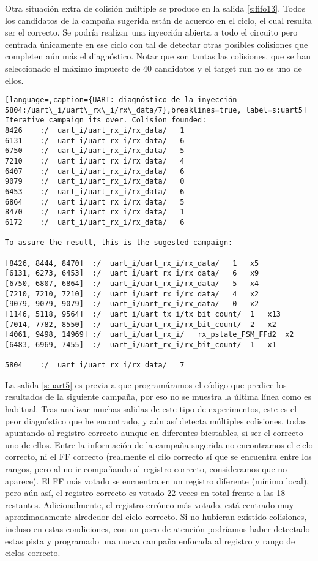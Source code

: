 Otra situación extra de colisión múltiple se produce en la salida \ref{s:fifo13}.
Todos los candidatos de la campaña sugerida están de acuerdo en el ciclo, el cual
resulta ser el correcto. Se podría realizar una inyección abierta a todo el 
circuito pero centrada únicamente en ese ciclo con tal de detectar otras posibles
colisiones que completen aún más el diagnóstico. Notar que son tantas las
colisiones, que se han seleccionado el máximo impuesto de 40 candidatos y el
target run no es uno de ellos.

\begin{lstlisting}[language=,caption={UART: diagnóstico de la inyección
5804:/uart\_i/uart\_rx\_i/rx\_data/7},breaklines=true, label=s:uart5]
Iterative campaign its over. Colision founded:
8426	:/	uart_i/uart_rx_i/rx_data/	1
6131	:/	uart_i/uart_rx_i/rx_data/	6
6750	:/	uart_i/uart_rx_i/rx_data/	5
7210	:/	uart_i/uart_rx_i/rx_data/	4
6407	:/	uart_i/uart_rx_i/rx_data/	6
9079	:/	uart_i/uart_rx_i/rx_data/	0
6453	:/	uart_i/uart_rx_i/rx_data/	6
6864	:/	uart_i/uart_rx_i/rx_data/	5
8470	:/	uart_i/uart_rx_i/rx_data/	1
6172	:/	uart_i/uart_rx_i/rx_data/	6

To assure the result, this is the sugested campaign:

[8426, 8444, 8470]	:/	uart_i/uart_rx_i/rx_data/	1	x5
[6131, 6273, 6453]	:/	uart_i/uart_rx_i/rx_data/	6	x9
[6750, 6807, 6864]	:/	uart_i/uart_rx_i/rx_data/	5	x4
[7210, 7210, 7210]	:/	uart_i/uart_rx_i/rx_data/	4	x2
[9079, 9079, 9079]	:/	uart_i/uart_rx_i/rx_data/	0	x2
[1146, 5118, 9564]	:/	uart_i/uart_tx_i/tx_bit_count/	1	x13
[7014, 7782, 8550]	:/	uart_i/uart_rx_i/rx_bit_count/	2	x2
[4061, 9498, 14969]	:/	uart_i/uart_rx_i/	rx_pstate_FSM_FFd2	x2
[6483, 6969, 7455]	:/	uart_i/uart_rx_i/rx_bit_count/	1	x1

5804	:/	uart_i/uart_rx_i/rx_data/	7
\end{lstlisting}

La salida \ref{s:uart5} es previa a que programáramos el código que predice los
resultados de la siguiente campaña, por eso no se muestra la última línea como es
habitual. Tras analizar muchas salidas de este tipo de experimentos, este es el 
peor diagnóstico que he encontrado, y aún así detecta múltiples colisiones, 
todas apuntando al registro correcto aunque en diferentes biestables, si ser el
correcto uno de ellos. Entre la información de la campaña sugerida no encontramos 
el ciclo correcto, ni el \gls{FF} correcto (realmente el cilo correcto sí que se
encuentra entre los rangos, pero al no ir compañando al registro correcto,
consideramos que no aparece). El \gls{FF} más votado se encuentra en un registro 
diferente (mínimo local), pero aún así, el registro correcto es votado 22 veces en
total frente a las 18 restantes. Adicionalmente, el registro erróneo más votado, 
está centrado muy aproximadamente alrededor del ciclo correcto. Si no hubieran 
existido colisiones, incluso en estas condiciones, con un poco de atención
podríamos haber detectado estas pista y programado una nueva campaña enfocada al
registro y rango de ciclos correcto.

